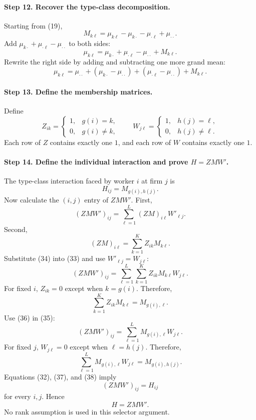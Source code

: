 \documentclass[11pt]{article}
\begin{document}
\paragraph{Step 12. Recover the type-class decomposition.}

Starting from (19),
\[
M_{k\ell}
=
\mu_{k\ell}-\mu_{k\cdot}-\mu_{\cdot\ell}+\mu_{\cdot\cdot}.
\]
Add \(\mu_{k\cdot}+\mu_{\cdot\ell}-\mu_{\cdot\cdot}\) to both sides:
\[
\mu_{k\ell}
=
\mu_{k\cdot}+\mu_{\cdot\ell}-\mu_{\cdot\cdot}+M_{k\ell}.
\tag{29}
\]
Rewrite the right side by adding and subtracting one more grand mean:
\[
\mu_{k\ell}
=
\mu_{\cdot\cdot}
+
(\mu_{k\cdot}-\mu_{\cdot\cdot})
+
(\mu_{\cdot\ell}-\mu_{\cdot\cdot})
+
M_{k\ell}.
\tag{30}
\]

\paragraph{Step 13. Define the membership matrices.}

Define
\[
Z_{ik}
=
\begin{cases}
1,&g(i)=k,\\
0,&g(i)\neq k,
\end{cases}
\qquad
W_{j\ell}
=
\begin{cases}
1,&h(j)=\ell,\\
0,&h(j)\neq\ell.
\end{cases}
\tag{31}
\]
Each row of \(Z\) contains exactly one \(1\), and each row of \(W\) contains
exactly one \(1\).

\paragraph{Step 14. Define the individual interaction and prove \(H=ZMW'\).}

The type-class interaction faced by worker \(i\) at firm \(j\) is
\[
H_{ij}=M_{g(i),h(j)}.
\tag{32}
\]
Now calculate the \((i,j)\) entry of \(ZMW'\).  First,
\[
(ZMW')_{ij}
=
\sum_{\ell=1}^L(ZM)_{i\ell}W'_{\ell j}.
\tag{33}
\]
Second,
\[
(ZM)_{i\ell}
=
\sum_{k=1}^KZ_{ik}M_{k\ell}.
\tag{34}
\]
Substitute (34) into (33) and use \(W'_{\ell j}=W_{j\ell}\):
\[
(ZMW')_{ij}
=
\sum_{\ell=1}^L\sum_{k=1}^K
Z_{ik}M_{k\ell}W_{j\ell}.
\tag{35}
\]
For fixed \(i\), \(Z_{ik}=0\) except when \(k=g(i)\).  Therefore,
\[
\sum_{k=1}^KZ_{ik}M_{k\ell}
=
M_{g(i),\ell}.
\tag{36}
\]
Use (36) in (35):
\[
(ZMW')_{ij}
=
\sum_{\ell=1}^LM_{g(i),\ell}W_{j\ell}.
\tag{37}
\]
For fixed \(j\), \(W_{j\ell}=0\) except when \(\ell=h(j)\).  Therefore,
\[
\sum_{\ell=1}^LM_{g(i),\ell}W_{j\ell}
=
M_{g(i),h(j)}.
\tag{38}
\]
Equations (32), (37), and (38) imply
\[
(ZMW')_{ij}=H_{ij}
\]
for every \(i,j\).  Hence
\[
H=ZMW'.
\tag{39}
\]
No rank assumption is used in this selector argument.
\end{document}
